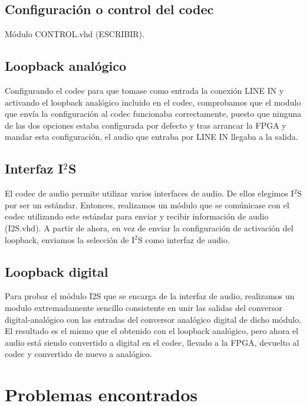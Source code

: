 	\subsection{Configuración o control del codec}

		Módulo CONTROL.vhd \textcolor{rosa}{(ESCRIBIR)}.

	
 
	\subsection{Loopback analógico}

		Configurando el codec para que tomase como entrada la conexión LINE IN y activando el loopback analógico incluido en el codec, comprobamos que el modulo que envía la configuración al codec funcionaba correctamente, puesto que ninguna de las dos opciones estaba configurada por defecto y tras arrancar la FPGA y mandar esta configuración, el audio que entraba por LINE IN llegaba a la salida.
		
	
	\subsection{Interfaz I$^2$S}

		El codec de audio permite utilizar varios interfaces de audio. De ellos elegimos I$^2$S por ser un estándar. Entonces, realizamos un módulo que se comúnicase con el codec utilizando este estándar para enviar y recibir información de audio (I2S.vhd). A partir de ahora, en vez de enviar la configuración de activación del loopback, enviamos la selección de I$^2$S como interfaz de audio.

	\subsection{Loopback digital}
		
		Para probar el módulo I2S que se encarga de la interfaz de audio, realizamos un modulo extremadamente sencillo consistente en unir las salidas del conversor digital-analógico con las entradas del conversor analógico digital de dicho módulo. El resultado es el mismo que el obtenido con el loopback analógico, pero ahora el audio está siendo convertido a digital en el codec, llevado a la FPGA, devuelto al codec y convertido de nuevo a analógico.

		

	
\section{Problemas encontrados}


